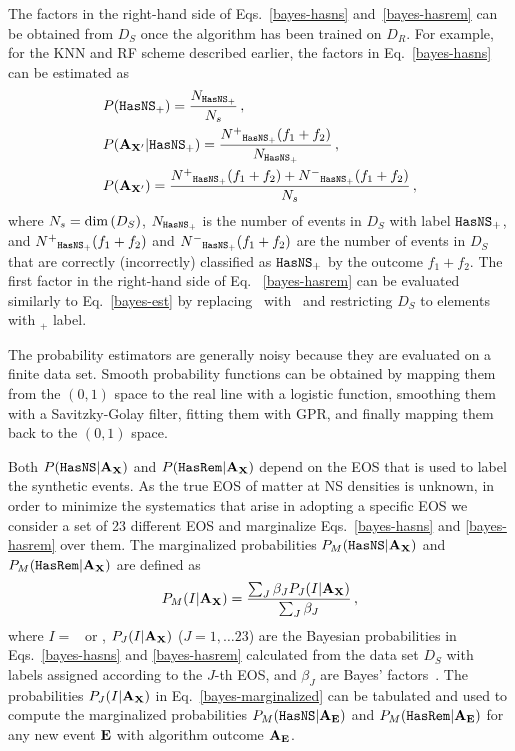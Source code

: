 The factors in the right-hand side of Eqs.~\eqref{bayes-hasns} and~\eqref{bayes-hasrem} can be obtained from $D_{S}$ once the algorithm has been trained on $D_{R}$. For example, for the \ac{KNN} and \ac{RF} scheme described earlier, the factors in Eq.~\eqref{bayes-hasns} can be estimated as  
%
\begin{equation}
\begin{aligned}
&P({{\tt HasNS}}_+)=\frac{N_{{{\tt HasNS}}_+}}{N_s}\,,\nonumber\\
&P({\bf A}_{{\bf X}'}|{{\tt HasNS}}_+)=\frac{N^+{}_{{{\tt HasNS}}_+}(f_1+f_2)}{N_{{{\tt HasNS}}_+}}\,,\nonumber\\
&P({\bf A}_{{\bf X}'})=\frac{N^+{}_{{{\tt HasNS}}_+}(f_1+f_2)+N^-{}_{{{\tt HasNS}}_+}(f_1+f_2)}{N_s}\,,
\label{bayes-est}
\end{aligned}
\end{equation}
%
where $N_s=\hbox{dim}\,(D_S)$, $N_{{{\tt HasNS}}_+}$ is the number of events in $D_S$ with label 
${{\tt HasNS}}_+$, and $N^+{}_{{{\tt HasNS}}_+}(f_1+f_2)$ and $N^-{}_{{{\tt HasNS}}_+}(f_1+f_2)$ are the number of events in $D_S$ that are correctly (incorrectly) classified as ${{{\tt HasNS}}_+}$ by the outcome $f_1+f_2$. The first factor in the right-hand side of Eq. ~\eqref{bayes-hasrem} can be evaluated similarly to Eq.~\eqref{bayes-est} by replacing \hasns\ with \hasrem\ and restricting $D_S$ to elements with \hasns$_+$ label.

The probability estimators are generally noisy because they are evaluated on a finite data set. Smooth probability functions can be obtained by mapping them from the $(0,1)$ space to the real
line with a logistic function, smoothing them with a Savitzky-Golay filter, fitting them with \ac{GPR}, and finally mapping them back to the $(0,1)$ space.   

Both $P({{\tt HasNS}}|{\bf A}_{\bf X})$ and $P({{\tt HasRem}}|{\bf A}_{\bf X})$ depend on the \ac{EOS} that is used to label the synthetic events. As the true \ac{EOS} of matter at \ac{NS} densities is unknown, in order to minimize the systematics that arise in adopting a specific \ac{EOS} we consider a set of 23 different \ac{EOS} and marginalize Eqs.~\eqref{bayes-hasns} and \eqref{bayes-hasrem} over them. The marginalized probabilities $P_M({{\tt HasNS}}|{\bf A}_{\bf X})$ and $P_M({{\tt HasRem}}|{\bf A}_{\bf X})$ are defined as
%
\begin{equation}
\begin{aligned}
P_M(I|{\bf A}_{\bf X})=\frac{\sum_J\beta_J P_J(I|{\bf A}_{\bf X})}{\sum_J\beta_J}\,,
\label{bayes-marginalized}
\end{aligned}
\end{equation}
%
where $I=$ \hasns\ or \hasrem, $P_J(I|{\bf A}_{\bf X})$ ($J=1,\dots 23$) are the Bayesian probabilities in Eqs.~\eqref{bayes-hasns} and \eqref{bayes-hasrem} calculated from the data set $D_S$ with labels assigned according to the $J$-th \ac{EOS}, and $\beta_J$ are Bayes' factors~\cite{Ghosh:2021eqv}. The probabilities $P_J(I|{\bf A}_{\bf X})$ in Eq.~\eqref{bayes-marginalized} can be tabulated and used to compute the marginalized probabilities $P_M({{\tt HasNS}}|{\bf A}_{\bf E})$ and $P_M({{\tt HasRem}}|{\bf A}_{\bf E})$ for any new event $\bf E$ with algorithm outcome $\bf A_{E}$.
